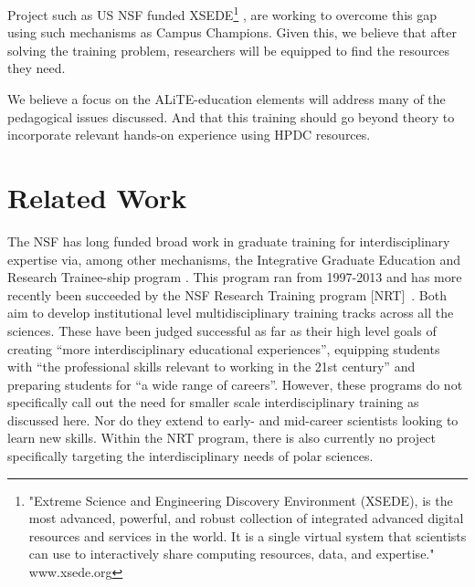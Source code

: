 \documentclass[conference]{IEEEtran}
\begin{document}
\begin{enumerate}[\setlength{\listparindent}{\parindent}]
Project such as US NSF funded XSEDE\footnote{"Extreme Science and Engineering Discovery Environment (XSEDE), is the most advanced, powerful, and robust collection of integrated advanced digital resources and services in the world. It is a single virtual system that scientists can use to interactively share computing resources, data, and expertise." www.xsede.org} \cite{noauthor_undated-lh}, are working to overcome this gap using such mechanisms as Campus Champions.  Given this, we believe that after solving the training problem, researchers will be equipped to find the resources they need. \end{enumerate} We believe a focus on the ALiTE-education elements will address many of the pedagogical issues discussed.  And that this training should go beyond theory to incorporate relevant hands-on experience using HPDC resources.

\section{Related Work}
The NSF has long funded broad work in graduate training for interdisciplinary expertise via, among other mechanisms, the Integrative Graduate Education and Research Trainee-ship program \cite{noauthor_undated-bu}.  This program ran from 1997-2013 and has more recently been succeeded by the NSF Research Training program [NRT]~\cite{NRT}.  Both aim to develop institutional level multidisciplinary training tracks across all the sciences. These have been judged successful as far as their high level goals of creating ``more interdisciplinary educational experiences'', equipping students with ``the professional skills relevant to working in the 21st century'' and preparing students for ``a wide range of careers''\cite{National2006}. However, these programs do not specifically call out the need for smaller scale interdisciplinary training as discussed here.  Nor do they extend to early- and mid-career scientists looking to learn new skills. Within the NRT program, there is also currently no project specifically targeting the interdisciplinary needs of polar sciences.
\end{document}
